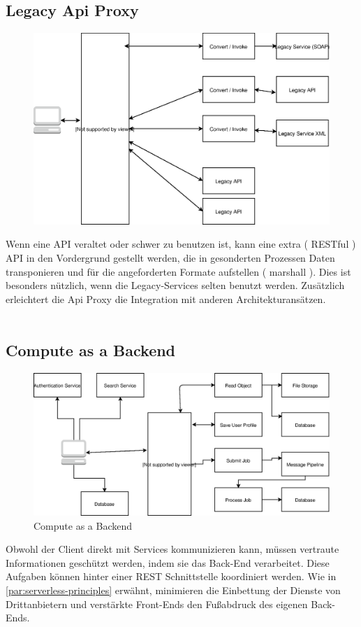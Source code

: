 \documentclass[
12pt,
english,
ngerman,
headsepline,
twoside,
openright,
numbers=noenddot,version=first
]{scrreprt}
\begin{document}
\subsection{Legacy Api Proxy}
\begin{figure}
	\includegraphics[width=0.9\linewidth]{./pics/legacy-api-proxy.eps}
\end{figure}
Wenn eine \acrshort{API} veraltet oder schwer zu benutzen ist, kann eine extra ( RESTful ) \acrshort{API} in den Vordergrund gestellt werden, die in gesonderten Prozessen Daten transponieren und für die angeforderten Formate aufstellen ( marshall ). Dies ist besonders nützlich, wenn die Legacy-Services selten benutzt werden. Zusätzlich erleichtert die Api Proxy die Integration mit anderen Architekturansätzen.
\\
\\


\subsection{Compute as a Backend}
\begin{figure}
	\includegraphics[scale=0.36]{./pics/compute-as-a-backend.eps}
	\caption{Compute as a Backend}
	\label{pic:compute-backend}
\end{figure}
Obwohl der Client direkt mit Services kommunizieren kann, müssen vertraute Informationen geschützt werden, indem sie das Back-End verarbeitet\cite{serverlessArchAWS}. Diese Aufgaben können hinter einer \acrshort{REST} Schnittstelle koordiniert werden. Wie in \autoref{par:serverless-principles} erwähnt, minimieren die Einbettung der Dienste von Drittanbietern und verstärkte Front-Ends den Fußabdruck des eigenen Back-Ends.
\end{document}
